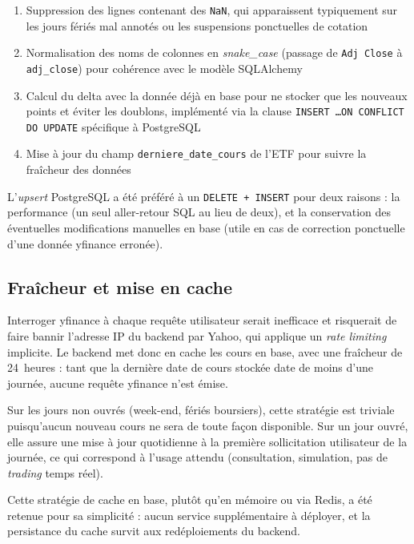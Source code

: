 \documentclass[11pt,a4paper]{article}
\begin{document}
\begin{enumerate}
    \item Suppression des lignes contenant des \texttt{NaN}, qui
    apparaissent typiquement sur les jours fériés mal annotés ou
    les suspensions ponctuelles de cotation
    \item Normalisation des noms de colonnes en \textit{snake\_case}
    (passage de \texttt{Adj Close} à \texttt{adj\_close}) pour
    cohérence avec le modèle SQLAlchemy
    \item Calcul du delta avec la donnée déjà en base pour ne
    stocker que les nouveaux points et éviter les doublons,
    implémenté via la clause \texttt{INSERT \dots ON CONFLICT DO
    UPDATE} spécifique à PostgreSQL
    \item Mise à jour du champ \texttt{derniere\_date\_cours} de
    l'ETF pour suivre la fraîcheur des données
\end{enumerate}

L'\textit{upsert} PostgreSQL a été préféré à un \texttt{DELETE +
INSERT} pour deux raisons : la performance (un seul aller-retour
SQL au lieu de deux), et la conservation des éventuelles
modifications manuelles en base (utile en cas de correction
ponctuelle d'une donnée yfinance erronée).

\subsection{Fraîcheur et mise en cache}

Interroger yfinance à chaque requête utilisateur serait inefficace
et risquerait de faire bannir l'adresse IP du backend par Yahoo,
qui applique un \textit{rate limiting} implicite. Le backend met
donc en cache les cours en base, avec une fraîcheur de 24~heures :
tant que la dernière date de cours stockée date de moins d'une
journée, aucune requête yfinance n'est émise.

Sur les jours non ouvrés (week-end, fériés boursiers), cette
stratégie est triviale puisqu'aucun nouveau cours ne sera de toute
façon disponible. Sur un jour ouvré, elle assure une mise à jour
quotidienne à la première sollicitation utilisateur de la journée,
ce qui correspond à l'usage attendu (consultation, simulation, pas
de \textit{trading} temps réel).

Cette stratégie de cache en base, plutôt qu'en mémoire ou via Redis,
a été retenue pour sa simplicité : aucun service supplémentaire à
déployer, et la persistance du cache survit aux redéploiements du
backend.
\end{document}
